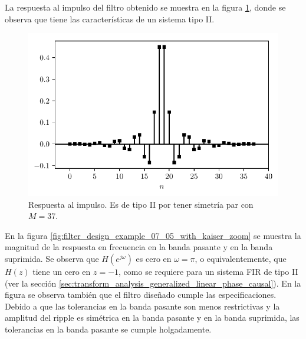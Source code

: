 \documentclass[a4paper]{report}
\begin{document}
La respuesta al impulso del filtro obtenido se muestra en la figura \ref{fig:filter_design_example_07_05_with_kaiser_impulse_response}, donde se observa que tiene las características de un sistema tipo II.
\begin{figure}[!htb]
  \begin{minipage}[c]{0.7\textwidth}
    \includegraphics[width=\textwidth]{figuras/filter_design_example_07_05_with_kaiser_impulse_response.pdf}
  \end{minipage}\hfill
  \begin{minipage}[c]{0.3\textwidth}
    \caption{
      Respuesta al impulso. Es de tipo II por tener simetría par con \(M=37\).
    }\label{fig:filter_design_example_07_05_with_kaiser_impulse_response}
  \end{minipage}
\end{figure}
En la figura \ref{fig:filter_design_example_07_05_with_kaiser_zoom} se muestra la magnitud de la respuesta en frecuencia en la banda pasante y en la banda suprimida. Se observa que \(H(e^{j\omega})\) es cero en \(\omega=\pi\), o equivalentemente, que \(H(z)\) tiene un cero en \(z=-1\), como se requiere para un sistema FIR de tipo II (ver la sección  \ref{sec:transform_analysis_generalized_linear_phase_causal}). En la figura se observa también que el filtro diseñado cumple las especificaciones. Debido a que las tolerancias en la banda pasante son menos restrictivas y la amplitud del ripple es simétrica en la banda pasante y en la banda suprimida, las tolerancias en la banda pasante se cumple holgadamente.
\end{document}
